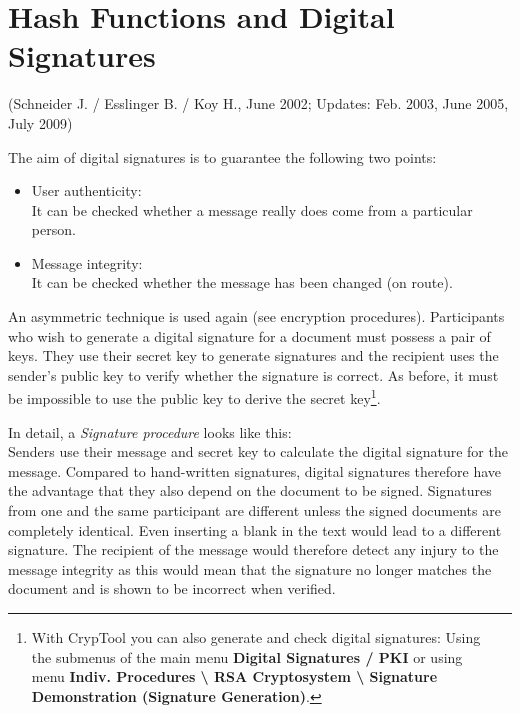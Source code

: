 
\newpage
\hypertarget{Chapter_Hashes-and-Digital-Signatures}{}
\chapter{Hash Functions and Digital Signatures}
\label{Chapter_Hashes-and-Digital-Signatures}
(Schneider J. / Esslinger B. / Koy H., June 2002;
Updates: Feb. 2003, June 2005, July 2009)

\vspace{12pt}
\noindent The aim of digital signatures is to guarantee the following two points:
\begin{itemize}
 \item User authenticity:  \\
      It can be checked whether a message really does
come from a particular person.
 \item Message integrity:   \\
      It can be checked whether the message has been
changed (on route).
\end{itemize}


An asymmetric technique is used again (see encryption procedures). Participants
who wish to generate a digital signature for a document must possess a pair of
keys. They use their secret key to generate signatures and the recipient uses
the sender's public key to verify whether the signature is correct. As before,
it must be impossible to use the public key to derive the secret key\footnote{%
With CrypTool you can also generate and check 
digital signatures: Using\\
the submenus of the main menu {\bf Digital Signatures / PKI}  or using\\
menu {\bf Indiv. Procedures \textbackslash{} RSA Cryptosystem 
\textbackslash{} Signature Demonstration (Signature Generation)}.
}.


In detail, a  {\em Signature procedure} looks like
this: \\ Senders use their message and secret key to calculate the digital
signature for the message. Compared to hand-written signatures, digital
signatures therefore have the advantage that they also depend on the document to
be signed. Signatures from one and the same participant are different unless the
signed documents are completely identical. Even inserting a blank in the text
would lead to a different signature. The recipient of the message would
therefore detect any injury to the message integrity as this would mean that the
signature no longer matches the document and is shown to be incorrect when
verified.

